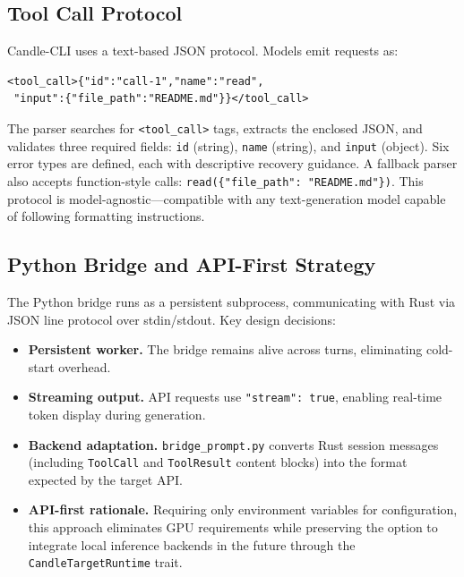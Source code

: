 \documentclass[11pt]{article}
\begin{document}
\subsection{Tool Call Protocol}

Candle-CLI uses a text-based JSON protocol. Models emit requests as:

\begin{lstlisting}[caption={Tool call format}, label={lst:tc}]
<tool_call>{"id":"call-1","name":"read",
 "input":{"file_path":"README.md"}}</tool_call>
\end{lstlisting}

The parser searches for \texttt{<tool\_call>} tags, extracts the enclosed JSON, and validates three required fields: \texttt{id} (string), \texttt{name} (string), and \texttt{input} (object). Six error types are defined, each with descriptive recovery guidance. A fallback parser also accepts function-style calls: \texttt{read(\{"file\_path": "README.md"\})}. This protocol is model-agnostic---compatible with any text-generation model capable of following formatting instructions.

\subsection{Python Bridge and API-First Strategy}

The Python bridge runs as a persistent subprocess, communicating with Rust via JSON line protocol over stdin/stdout. Key design decisions:

\begin{itemize}[leftmargin=*]
    \item \textbf{Persistent worker.} The bridge remains alive across turns, eliminating cold-start overhead.
    \item \textbf{Streaming output.} API requests use \texttt{"stream": true}, enabling real-time token display during generation.
    \item \textbf{Backend adaptation.} \texttt{bridge\_prompt.py} converts Rust session messages (including \texttt{ToolCall} and \texttt{ToolResult} content blocks) into the format expected by the target API.
    \item \textbf{API-first rationale.} Requiring only environment variables for configuration, this approach eliminates GPU requirements while preserving the option to integrate local inference backends in the future through the \texttt{CandleTargetRuntime} trait.
\end{itemize}
\end{document}
